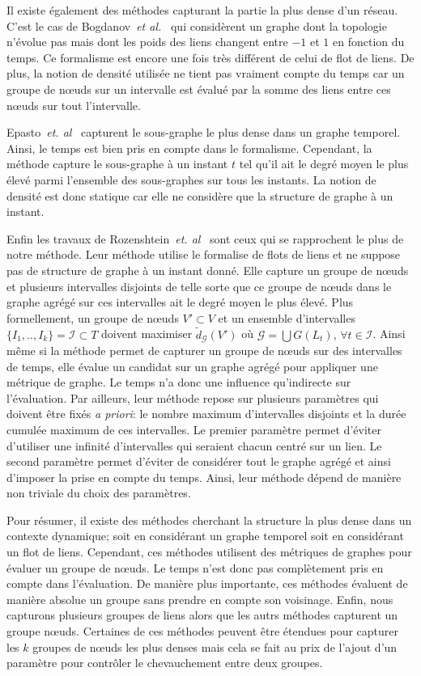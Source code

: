 Il existe également des méthodes capturant la partie la plus dense d'un réseau.
C'est le cas de Bogdanov~\emph{et al.}~\cite{Bogdanov2011} qui considèrent  un graphe dont la topologie n'évolue pas mais dont les poids des liens changent entre $-1$ et $1$ en fonction du temps.
Ce formalisme est encore une fois très différent de celui de flot de liens.
De plus, la notion de densité utilisée ne tient pas vraiment compte du temps car un groupe de n\oe uds sur un intervalle est évalué par la somme des liens entre ces n\oe uds sur tout l'intervalle.


Epasto~\emph{et. al}~\cite{Epasto2015} capturent le sous-graphe le plus dense dans un graphe temporel.
Ainsi, le temps est bien pris en compte dans le formalisme.
Cependant, la méthode capture le sous-graphe à un instant $t$ tel qu'il ait le degré moyen le plus élevé parmi l'ensemble des sous-graphes sur tous les instants.
La notion de densité est donc statique car elle ne considère que la structure de graphe à un instant.


Enfin les travaux de Rozenshtein~\emph{et. al}~\cite{rozenshtein2014} sont ceux qui se rapprochent le plus de notre méthode.
Leur méthode utilise le formalise de flots de liens et ne suppose pas de structure de graphe à un instant donné.
Elle capture un groupe de n\oe uds et plusieurs intervalles disjoints de telle sorte que ce groupe de n\oe uds dans le graphe agrégé sur ces intervalles ait le degré moyen le plus élevé.
Plus formellement, un groupe de n\oe uds $V'\subset V$ et un ensemble d'intervalles $\{I_1,..,I_k\} = \mathcal{I} \subset T$ doivent maximiser $\tilde{d}_\mathcal{G}(V')$ où  $\mathcal{G}= \bigcup G(L_t),\,\forall t \in \mathcal{I}$.
Ainsi même si la méthode permet de capturer un groupe de n\oe uds sur des intervalles de temps, elle évalue un candidat sur un graphe agrégé pour appliquer une métrique de graphe.
Le temps n'a donc une influence qu'indirecte sur l'évaluation.
Par ailleurs, leur méthode repose sur plusieurs paramètres qui doivent être fixés \emph{a priori}: le nombre maximum d'intervalles disjoints et la durée cumulée maximum de ces intervalles.
Le premier paramètre permet d'éviter d'utiliser une infinité d'intervalles qui seraient chacun centré sur un lien.
Le second paramètre permet d'éviter de considérer tout le graphe agrégé et ainsi d'imposer la prise en compte du temps.
Ainsi, leur méthode dépend de manière non triviale du choix des paramètres.

\bigskip

Pour résumer, il existe des méthodes cherchant la structure la plus dense dans un contexte dynamique; soit en considérant un graphe temporel soit en considérant un flot de liens.
Cependant, ces méthodes utilisent des métriques de graphes pour évaluer un groupe de n\oe uds.
Le temps n'est donc pas complètement pris en compte dans l'évaluation.
De manière plus importante, ces méthodes évaluent de manière absolue un groupe sans prendre en compte son voisinage.
Enfin, nous capturons plusieurs groupes de liens alors que les autrs méthodes capturent un groupe n\oe uds.
Certaines de ces méthodes peuvent être étendues pour capturer les $k$ groupes de n\oe uds les plus denses mais cela se fait au prix de l'ajout d'un paramètre pour contrôler le chevauchement entre deux groupes.


